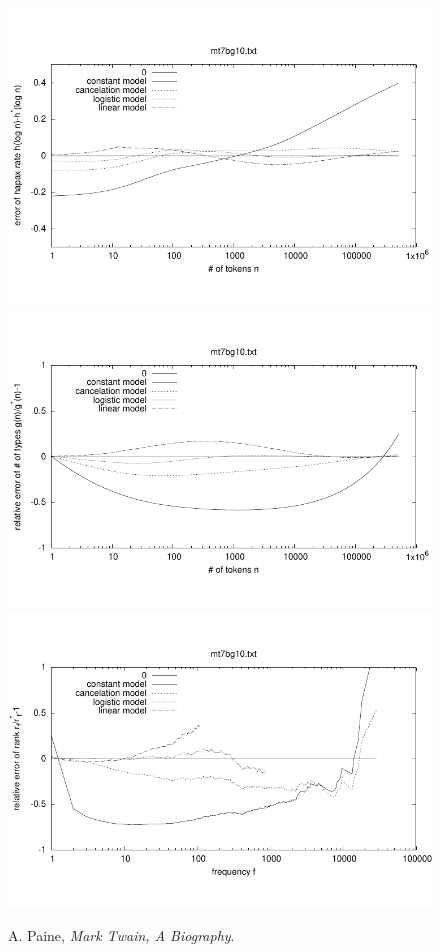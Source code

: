 \documentclass[a4paper,12pt]{article}
\begin{document}
\begin{figure}[p]
  \centering
  \vspace{-2em}
  \includegraphics[width=0.8\columnwidth]{output/herdan/mt7bg10_27/token_ratio_residual.pdf}
  \\[-3em]
  \includegraphics[width=0.8\columnwidth]{output/herdan/mt7bg10_27/token_residual.pdf}
  \\[-3em]
  \includegraphics[width=0.8\columnwidth]{output/herdan/mt7bg10_27/frequency_residual.pdf}
  \vspace{-2em}
  \caption{A. Paine, \emph{Mark Twain, A Biography}.\label{figmt7bg10R}}
\end{figure}
\end{document}
